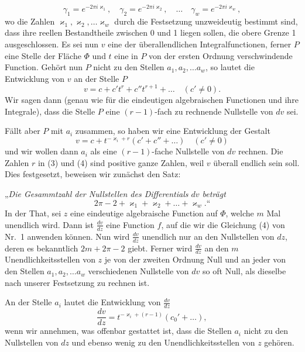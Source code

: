 \documentclass{article}
\begin{document}
\[
\gamma_1 = e^{-2\pi i\varkappa_1}, \quad \gamma_2 = e^{-2\pi i\varkappa_2}, \quad \dots \quad \gamma_w = e^{-2\pi i\varkappa_w}, \tag{2}
\]
wo die Zahlen $\varkappa_1, \varkappa_2, \dots \varkappa_w$ durch die Festsetzung unzweideutig bestimmt sind, dass ihre reellen Bestandtheile zwischen 0 und 1 liegen sollen, die obere Grenze 1 ausgeschlossen. Es sei nun $v$ eine der überallendlichen Integralfunctionen, ferner $P$ eine Stelle der Fläche $\Phi$ und $t$ eine in $P$ von der ersten Ordnung verschwindende Function. Gehört nun $P$ nicht zu den Stellen $a_1, a_2, \dots a_w$, so lautet die Entwicklung von $v$ an der Stelle $P$
\[
v = c + c' t^r + c'' t^{r+1} + \dots \quad (c' \neq 0). \tag{3}
\]
Wir sagen dann (genau wie für die eindeutigen algebraischen Functionen und ihre Integrale), dass die Stelle $P$ eine $(r-1)$-fach zu rechnende Nullstelle von $dv$ sei.

Fällt aber $P$ mit $a_i$ zusammen, so haben wir eine Entwicklung der Gestalt
\[
v = c + t^{-\varkappa_i + r}(c' + c'' + \dots) \quad (c' \neq 0) \tag{4}
\]
und wir wollen dann $a_i$ als eine $(r-1)$-fache Nullstelle von $dv$ rechnen. Die Zahlen $r$ in (3) und (4) sind positive ganze Zahlen, weil $v$ überall endlich sein soll. Dies festgesetzt, beweisen wir zunächst den Satz:

„\emph{Die Gesammtzahl der Nullstellen des Differentials $dv$ beträgt}
\[
2\pi - 2 + \varkappa_1 + \varkappa_2 + \dots + \varkappa_w\text{.“}
\]
In der That, sei $z$ eine eindeutige algebraische Function auf $\Phi$, welche $m$ Mal unendlich wird. Dann ist $\frac{dv}{dz}$ eine Function $f$, auf die wir die Gleichung (4) von Nr.~1 anwenden können. Nun wird $\frac{dv}{dz}$ unendlich nur an den Nullstellen von $dz$, deren es bekanntlich $2m+2\pi-2$ giebt. Ferner wird $\frac{dv}{dz}$ an den $m$ Unendlichkeitsstellen von $z$ je von der zweiten Ordnung Null und an jeder von den Stellen $a_1, a_2, \dots a_w$ verschiedenen Nullstelle von $dv$ so oft Null, als dieselbe nach unserer Festsetzung zu rechnen ist.

An der Stelle $a_i$ lautet die Entwicklung von $\frac{dv}{dz}$
\[
\frac{dv}{dz} = t^{-\varkappa_i + (r-1)} (c_0' + \dots),
\]
wenn wir annehmen, was offenbar gestattet ist, dass die Stellen $a_i$ nicht zu den Nullstellen von $dz$ und ebenso wenig zu den Unendlichkeitsstellen von $z$ gehören.
\end{document}
